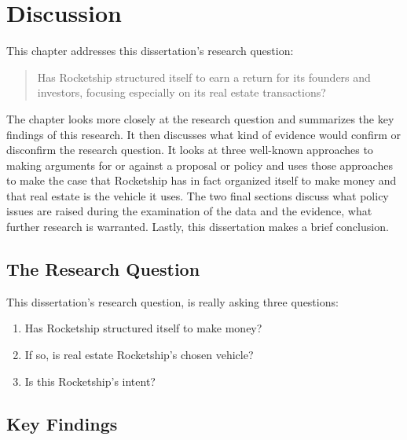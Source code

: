 
\chapter{Discussion}\label{ch:discussion}\indent%

This chapter addresses this dissertation's research question:
\medskip%
\begin{quote}\noindent%
  Has Rocketship structured itself to earn a return for its founders and investors, focusing especially on its real estate transactions?
\end{quote}
The chapter looks more closely at the research question and summarizes the key findings of this research. It then discusses what kind of evidence would confirm or disconfirm the research question. It looks at three well-known approaches to making arguments for or against a proposal or policy and uses those approaches to make the case that Rocketship has in fact organized itself to make money and that real estate is the vehicle it uses. The two final sections discuss what policy issues are raised during the examination of the data and the evidence, what further research is warranted. Lastly, this dissertation makes a brief conclusion.

\section{The Research Question}\label{sec:research-question}\indent%

This dissertation's research question, is really asking three questions:
\begin{enumerate}
  \item Has Rocketship structured itself to make money?
  \item If so, is real estate Rocketship's chosen vehicle?
  \item Is this Rocketship's intent?
\end{enumerate}

\section{Key Findings}\label{sec:summary-key-findings}\indent %

